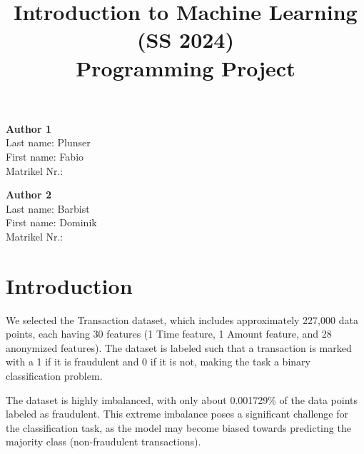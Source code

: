 \documentclass[a4, 10 pt, conference]{ieeeconf}  %
\title{\LARGE \bf
Introduction to Machine Learning (SS 2024)\\ Programming Project
\vspace{-3em}
}
\begin{document}
\maketitle
\vspace{-3em}
\thispagestyle{empty}
\pagestyle{empty}

\begin{strip}
  \begin{tcolorbox}[
      size=tight,
      colback=white,
      boxrule=0.2mm,
      left=3mm,right=3mm, top=3mm, bottom=1mm
    ]
    {\begin{multicols}{2}%

        \textbf{Author 1}       \\
        Last name: Plunser              \\  %
        First name: Fabio             \\  %
        Matrikel Nr.:               \\  %

        \columnbreak

        \textbf{Author 2}       \\
        Last name: Barbist              \\  %
        First name: Dominik             \\  %
        Matrikel Nr.:               \\  %

        \columnbreak

      \end{multicols}}
  \end{tcolorbox}
\end{strip}


\section{Introduction}
\label{sec:intro}
We selected the Transaction dataset, which includes approximately 227,000 data points, each having 30 features (1 Time feature, 1 Amount feature, and 28 anonymized features). The dataset is labeled such that a transaction is
marked with a 1 if it is fraudulent and 0 if it is not, making the task a binary classification problem.

The dataset is highly imbalanced, with only about 0.001729\% of the data points labeled as fraudulent. This extreme imbalance poses a significant challenge for the classification task, as the model may become
biased towards predicting the majority class (non-fraudulent transactions).
\end{document}
